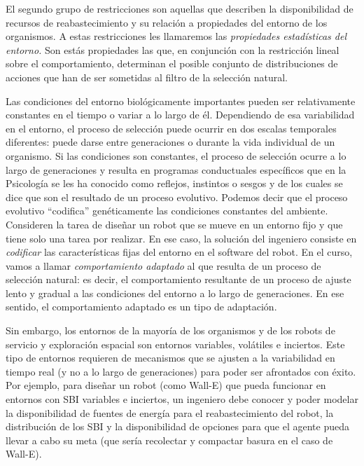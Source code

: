 \documentclass[
  letterpaper,
]{book}
\begin{document}
El segundo grupo de restricciones son aquellas que describen la
disponibilidad de recursos de reabastecimiento y su relación a
propiedades del entorno de los organismos. A estas restricciones les
llamaremos las \emph{propiedades estadísticas del entorno.} Son estás
propiedades las que, en conjunción con la restricción lineal sobre el
comportamiento, determinan el posible conjunto de distribuciones de
acciones que han de ser sometidas al filtro de la selección natural.

Las condiciones del entorno biológicamente importantes pueden ser
relativamente constantes en el tiempo o variar a lo largo de él.
Dependiendo de esa variabilidad en el entorno, el proceso de selección
puede ocurrir en dos escalas temporales diferentes: puede darse entre
generaciones o durante la vida individual de un organismo. Si las
condiciones son constantes, el proceso de selección ocurre a lo largo de
generaciones y resulta en programas conductuales específicos que en la
Psicología se les ha conocido como reflejos, instintos o sesgos y de los
cuales se dice que son el resultado de un proceso evolutivo. Podemos
decir que el proceso evolutivo ``codifica'' genéticamente las
condiciones constantes del ambiente. Consideren la tarea de diseñar un
robot que se mueve en un entorno fijo y que tiene solo una tarea por
realizar. En ese caso, la solución del ingeniero consiste en
\emph{codificar} las características fijas del entorno en el software
del robot. En el curso, vamos a llamar \emph{comportamiento adaptado} al
que resulta de un proceso de selección natural: es decir, el
comportamiento resultante de un proceso de ajuste lento y gradual a las
condiciones del entorno a lo largo de generaciones. En ese sentido, el
comportamiento adaptado es un tipo de adaptación.

Sin embargo, los entornos de la mayoría de los organismos y de los
robots de servicio y exploración espacial son entornos variables,
volátiles e inciertos. Este tipo de entornos requieren de mecanismos que
se ajusten a la variabilidad en tiempo real (y no a lo largo de
generaciones) para poder ser afrontados con éxito. Por ejemplo, para
diseñar un robot (como Wall-E) que pueda funcionar en entornos con SBI
variables e inciertos, un ingeniero debe conocer y poder modelar la
disponibilidad de fuentes de energía para el reabastecimiento del robot,
la distribución de los SBI y la disponibilidad de opciones para que el
agente pueda llevar a cabo su meta (que sería recolectar y compactar
basura en el caso de Wall-E).
\end{document}
